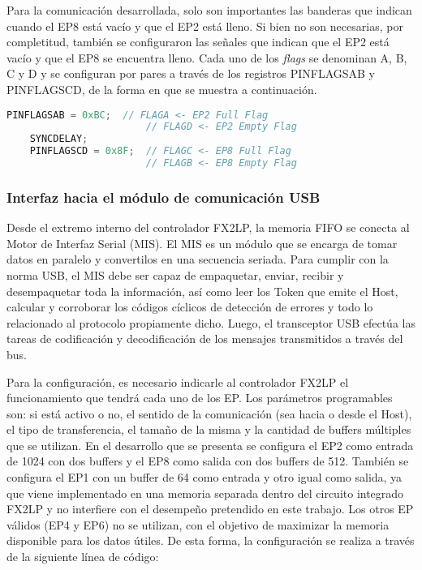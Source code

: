 	Para la comunicación desarrollada, solo son importantes las banderas que indican cuando el EP8 está vacío y que el EP2 está lleno. Si bien no son necesarias, por completitud, también se configuraron las señales que indican que el EP2 está vacío y que el EP8 se encuentra lleno. Cada uno de los \textit{flags} se denominan A, B, C y D y se configuran por pares a través de los registros PINFLAGSAB y PINFLAGSCD, de la forma en que se muestra a continuación.
	
	\begin{lstlisting}[language=C,backgroundcolor=\color{gray!30}]
	PINFLAGSAB = 0xBC;	// FLAGA <- EP2 Full Flag
						// FLAGD <- EP2 Empty Flag
	SYNCDELAY;
	PINFLAGSCD = 0x8F;	// FLAGC <- EP8 Full Flag
						// FLAGB <- EP8 Empty Flag
	\end{lstlisting}
	
	
\subsubsection{Interfaz hacia el módulo de comunicación USB}
	Desde el extremo interno del controlador FX2LP, la memoria FIFO se conecta al Motor de Interfaz Serial (MIS). El MIS es un módulo que se encarga de tomar datos en paralelo y convertilos en una secuencia seriada. Para cumplir con la norma USB, el MIS debe ser capaz de empaquetar, enviar, recibir y desempaquetar toda la información, así como leer los Token que emite el Host, calcular y corroborar los códigos cíclicos de detección de errores y todo lo relacionado al protocolo propiamente dicho. Luego, el transceptor USB efectúa las tareas de codificación y decodificación de los mensajes transmitidos a través del bus.
	
	Para la configuración, es necesario indicarle al controlador FX2LP el funcionamiento que tendrá cada uno de los EP. Los parámetros programables son: si está activo o no, el sentido de la comunicación (sea hacia o desde el Host), el tipo de transferencia, el tamaño de la misma y la cantidad de buffers múltiples que se utilizan. En el desarrollo que se presenta se configura el EP2 como entrada de \SI{1024}{\byte} con dos buffers y el EP8 como salida con dos buffers de \SI{512}{\byte}. También se configura el EP1 con un buffer de \SI{64}{\byte} como entrada y otro igual como salida, ya que viene implementado en una memoria separada dentro del circuito integrado FX2LP y no interfiere con el desempeño pretendido en este trabajo. Los otros EP válidos (EP4 y EP6) no se utilizan, con el objetivo de maximizar la memoria disponible para los datos útiles. De esta forma, la configuración se realiza a través de la siguiente línea de código:
	
